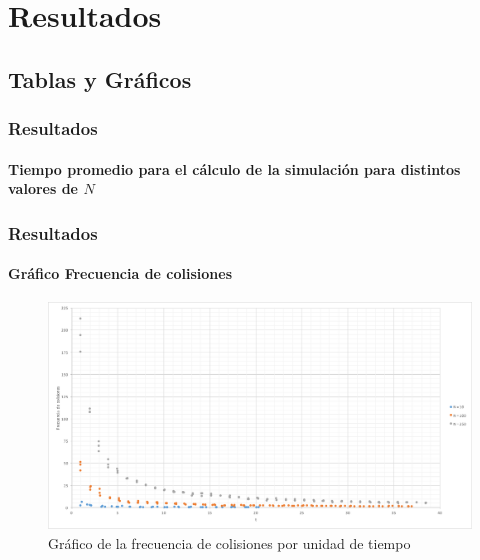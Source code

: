 \documentclass[hyperref={pdfpagelayout=SinglePage}]{beamer}
\begin{document}
\section{Resultados}

\subsection{Tablas y Gráficos}

\begin{frame}
\frametitle{Resultados}
\framesubtitle{Tiempo promedio para el cálculo de la simulación para distintos valores de $N$}
\begin{center}
\begin{table}[h]
\centering
{}
\caption{Tiempo promedio para el cálculo de la simulación para distintos valores de $N$.}
\end{table}
\end{center}
\end{frame}

\begin{frame}
\frametitle{Resultados}
\framesubtitle{Gráfico Frecuencia de colisiones}
\begin{figure}[H]
        \centering
        \includegraphics[width=\textwidth]{Frecuenciaxt.pdf}
        \caption{Gráfico de la frecuencia de colisiones por unidad de tiempo}
\end{figure}
\end{frame}
\end{document}
